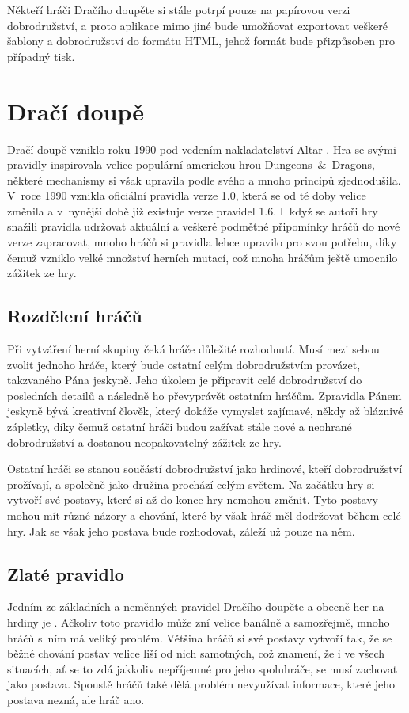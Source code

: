 \documentclass[thesis=B,czech]{resources/FITthesis}[2012/06/26]
\begin{document}
Někteří hráči Dračího doupěte si stále potrpí pouze na papírovou verzi dobrodružství, a proto aplikace mimo jiné bude umožňovat exportovat veškeré šablony a dobrodružství do formátu HTML, jehož formát bude přizpůsoben pro případný tisk. 

	\section{Dračí doupě}
	Dračí doupě vzniklo roku 1990 pod vedením nakladatelství Altar \cite{altar}. Hra se svými pravidly inspirovala velice populární americkou hrou Dungeons~\&~Dragons, některé mechanismy si však upravila podle svého a mnoho principů zjednodušila. V~roce 1990 vznikla oficiální pravidla verze 1.0, která se od té doby velice změnila a v~nynější době již existuje verze pravidel 1.6. I~když se autoři hry snažili pravidla udržovat aktuální a veškeré podmětné připomínky hráčů do nové verze zapracovat, mnoho hráčů si pravidla lehce upravilo pro svou potřebu, díky čemuž vzniklo velké množství herních mutací, což mnoha hráčům ještě umocnilo zážitek ze hry. 
	
	\subsection{Rozdělení hráčů}
Při vytváření herní skupiny čeká hráče důležité rozhodnutí. Musí mezi sebou zvolit jednoho hráče, který bude ostatní celým dobrodružstvím provázet, takzvaného Pána jeskyně. Jeho úkolem je připravit celé dobrodružství do posledních detailů a následně ho převyprávět ostatním hráčům. Zpravidla Pánem jeskyně bývá kreativní člověk, který dokáže vymyslet zajímavé, někdy až bláznivé zápletky, díky čemuž ostatní hráči budou zažívat stále nové a neohrané dobrodružství a dostanou neopakovatelný zážitek ze hry. \par

Ostatní hráči se stanou součástí dobrodružství jako hrdinové, kteří dobrodružství prožívají, a společně jako družina prochází celým světem. Na začátku hry si vytvoří své postavy, které si až do konce hry nemohou změnit. Tyto postavy mohou mít různé názory a chování, které by však hráč měl dodržovat během celé hry. Jak se však jeho postava bude rozhodovat, záleží už pouze na něm.


	\subsection{Zlaté pravidlo}
Jedním ze základních a neměnných pravidel Dračího doupěte a obecně her na hrdiny je . Ačkoliv toto pravidlo může zní velice banálně a samozřejmě, mnoho hráčů s~ním má veliký problém. Většina hráčů si své postavy vytvoří tak, že se běžné chování postav velice liší od nich samotných, což znamení, že i ve všech situacích, ať se to zdá jakkoliv nepříjemné pro jeho spoluhráče, se musí zachovat jako postava. Spoustě hráčů také dělá problém nevyužívat informace, které jeho postava nezná, ale hráč ano. \par
\end{document}

